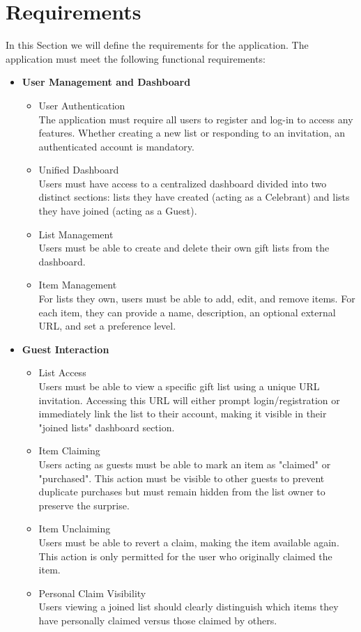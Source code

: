 \section{Requirements}
In this Section we will define the requirements for the application. The application must meet the following functional requirements:
\begin{itemize}
    \item \textbf{User Management and Dashboard}
    \begin{itemize}
        \item User Authentication \\
            The application must require all users to register and log-in to access any features. Whether creating a new list or responding to an invitation, an authenticated account is mandatory.
        \item Unified Dashboard \\
            Users must have access to a centralized dashboard divided into two distinct sections: lists they have created (acting as a Celebrant) and lists they have joined (acting as a Guest).
        \item List Management \\
            Users must be able to create and delete their own gift lists from the dashboard.
        \item Item Management \\
            For lists they own, users must be able to add, edit, and remove items. For each item, they can provide a name, description, an optional external URL, and set a preference level.
    \end{itemize}

    \item \textbf{Guest Interaction}
    \begin{itemize}
        \item List Access \\
            Users must be able to view a specific gift list using a unique URL invitation. Accessing this URL will either prompt login/registration or immediately link the list to their account, making it visible in their "joined lists" dashboard section.
        \item Item Claiming \\
            Users acting as guests must be able to mark an item as "claimed" or "purchased". This action must be visible to other guests to prevent duplicate purchases but must remain hidden from the list owner to preserve the surprise.
        \item Item Unclaiming \\
            Users must be able to revert a claim, making the item available again. This action is only permitted for the user who originally claimed the item.
        \item Personal Claim Visibility \\
            Users viewing a joined list should clearly distinguish which items they have personally claimed versus those claimed by others.
    \end{itemize}


\end{itemize}
